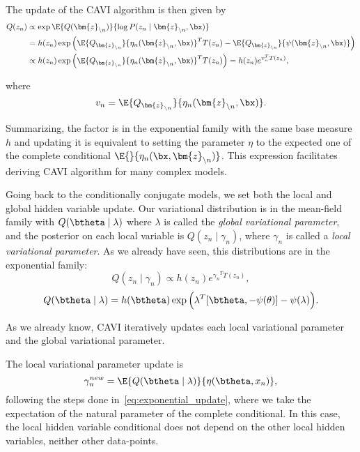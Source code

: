 The update of the CAVI algorithm  is then given by
  \begin{align}
    Q(z_{n}) &\propto \exp{\E{Q(\bm{z}_{\backslash n})}{\log P(z_{n} \mid \bm{z}_{\backslash n}, \bx)}} \nonumber\\
    &= h(z_{n})\exp \Big(\E{Q_{\bm{z}_{\backslash n}}}{ {\eta_{n}(\bm{z}_{\backslash n}, \bx)}}^{T}T(z_{n}) - \E{Q_{\bm{z}_{\backslash n}}}{ \psi(\bm{z}_{\backslash n}, \bx)}\Big) \nonumber \\
    &\propto  h(z_{n})\exp \Big(\E{Q_{\bm{z}_{\backslash n}}}{ {\eta_{n}(\bm{z}_{\backslash n}, \bx)}}^{T}T(z_{n})\Big) = h(z_{n})e^{v_{n}^{T}T(z_{n}) }, \label{eq:exponential_update}
  \end{align}

where
\[
  v_{n} = \E{Q_{\bm{z}_{\backslash n}}}{\eta_{n}(\bm{z}_{\backslash n}, \bx)}.
\]

Summarizing, the factor is in the exponential family with the same base measure \(h\) and updating it is equivalent to setting the parameter \(\eta\) to the expected one of the complete conditional \(\E{}{\eta_{n}(\bx, \bm{z}_{\backslash n})}\). This expression facilitates deriving CAVI algorithm for many complex models.

Going back to the conditionally conjugate models, we set both the local and global hidden variable update. Our variational distribution is in the mean-field family with \(Q(\btheta \mid \lambda)\) where \(\lambda\) is called the \emph{global variational parameter}, and the posterior on each local variable is \(Q(z_{n} \mid \gamma_{n})\), where \(\gamma_{n}\) is called a \emph{local variational parameter}.
As we already have seen, this distributions are in the exponential family:
\[
  Q(z_{n} \mid \gamma_{n}) \propto h(z_{n})e^{{\gamma_{n}}^{T}T(z_{n})},
\]
\[
  Q(\btheta \mid \lambda) = h(\btheta) \exp \Big( {\lambda}^{T}[\btheta, -\psi(\theta)] - \psi(\lambda) \Big).
\]

As we already know, CAVI iteratively updates each local variational parameter and the global variational parameter.

The local variational parameter update is
\[
  \gamma_{n}^{new} = \E{Q(\btheta \mid \lambda)}{\eta(\btheta, x_{n})},
\]
following the steps done in~\ref{eq:exponential_update}, where we take the expectation of the natural parameter of the complete conditional. In this case, the local hidden variable conditional does not depend on the other local hidden variables, neither other data-points.

